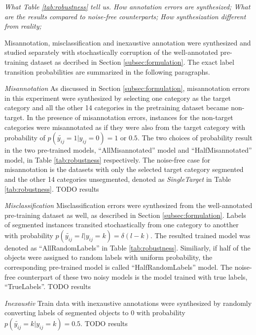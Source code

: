 \noindent \textit{What Table \ref{tab:robustness} tell us.
How annotation errors are synthesized;
What are the results compared to noise-free counterparts;
How synthesization different from reality;
}

\noindent
Misannotation, misclassification and inexaustive annotation were synthesized and studied separately with stochastically corruption of the well-annotated pre-training dataset as decribed in Section \ref{subsec:formulation}.
The exact label transition probabilities are summarized in the following paragraphs.

\noindent \textit{Misannotation}
\noindent
As discussed in Section \ref{subsec:formulation}, misannotation errors in this experiment were synthesized by selecting one category as the target category and all the other 14 categories in the pretraining dataset became non-target.
In the presence of misannotation errors, instances for the non-target categories were misannotated as if they were also from the target category with probability of $p(\tilde{y_{ij}}=1 \vert y_{ij}=0) = 1 \text{ or } 0.5$.
The two choices of probability result in the two pre-trained models, ``AllMisannotated'' model and ``HalfMisannotated'' model, in Table \ref{tab:robustness} respectively.
The noise-free case for misannotation is the datasets with only the selected target category segmented and the other 14 categories unsegmented, denoted as \textit{SingleTarget} in Table \ref{tab:robustness}.
{TODO results}

\noindent \textit{Misclassification}
\noindent
Misclassification errors were synthesized from the well-annotated pre-training dataset as well, as described in Section \ref{subsec:formulation}.
Labels of segmented instances transited stochastically from one category to anotther with probability $p(\tilde{y_{ij}}=l \vert y_{ij}=k) = \delta(l-k)$.
The resulted trained model was denoted as ``AllRandomLabels'' in Table \ref{tab:robustness}.
Similiarly, if half of the objects were assigned to random labels with uniform probability, the corresponding pre-trained model is called ``HalfRandomLabels'' model.
The noise-free counterpart of these two noisy models is the model trained with true labels, ``TrueLabels''.
{TODO results}

\noindent \textit{Inexaustiv}
\noindent
Train data with inexaustive annotations were synthesized by randomly converting labels of segmented objects to 0 with probability $p(\tilde{y_{ij}}=k \vert y_{ij}=k) = 0.5$.
{TODO results}

